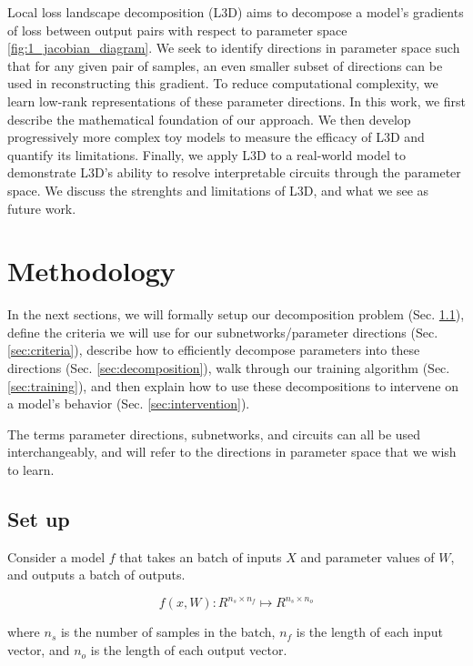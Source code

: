 \documentclass{article}
\theoremstyle{plain}
\theoremstyle{definition}
\theoremstyle{remark}
\begin{document}
Local loss landscape decomposition (L3D) aims to decompose a model's gradients of loss between output pairs with respect to parameter space \ref{fig:1_jacobian_diagram}. We seek to identify directions in parameter space such that for any given pair of samples, an even smaller subset of directions can be used in reconstructing this gradient. To reduce computational complexity, we learn low-rank representations of these parameter directions. In this work, we first describe the mathematical foundation of our approach. We then develop progressively more complex toy models to measure the efficacy of L3D and quantify its limitations. Finally, we apply L3D to a real-world model to demonstrate L3D's ability to resolve interpretable circuits through the parameter space. We discuss the strenghts and limitations of L3D, and what we see as future work. 


\section{Methodology}

In the next sections, we will formally setup our decomposition problem (Sec. \ref{sec:setup}), define the criteria we will use for our subnetworks/parameter directions (Sec. \ref{sec:criteria}), describe how to efficiently decompose parameters into these directions (Sec. \ref{sec:decomposition}), walk through our training algorithm (Sec. \ref{sec:training}), and then explain how to use these decompositions to intervene on a model's behavior (Sec. \ref{sec:intervention}). 

The terms parameter directions, subnetworks, and circuits can all be used interchangeably, and will refer to the directions in parameter space that we wish to learn. 

\subsection{Set up}\label{sec:setup}


Consider a model $f$ that takes an batch of inputs $X$ and parameter values of $W$, and outputs a batch of outputs.

\begin{equation}
    f(x, W) : R^{n_s \times n_f} \mapsto R^{n_s \times n_o}
\end{equation}

where $n_s$ is the number of samples in the batch, $n_f$ is the length of each input vector, and $n_o$ is the length of each output vector.
\end{document}
